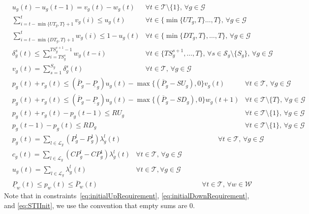 \documentclass{article}
\newcommand{\cT}{{\mathcal T}}
\newcommand{\cS}{{\mathcal S}}
\newcommand{\cG}{{\mathcal G}}
\newcommand{\cL}{{\mathcal L}}
\newcommand{\cW}{{\mathcal W}}
\newcommand{\uP}{\underline{P}}
\newcommand{\oP}{\overline{P}}
\begin{document}
{\begin{align}
		& u_g(t) - u_g(t-1) = v_g(t) - w_g(t) & \forall t \in \cT\setminus\{1\}, \, \forall g \in \cG \label{eq:Logical} \\
		& \sum_{i= t-\min\{UT_g,T\} + 1}^t v_g(i) \leq u_g(t) & \forall t \in \{\min\{UT_g,T\} \ldots, T\}, \, \forall g \in \cG \label{eq:Startup} \\
		& \sum_{i= t-\min\{DT_g,T\} + 1}^t w_g(i) \leq 1 - u_g(t) & \forall t \in \{\min\{DT_g, T\}, \ldots, T\}, \, \forall g \in \cG \label{eq:Shutdown} \\
		& \delta^s_g(t) \leq \sum_{i = TS^s_g}^{TS^{s+1}_g-1} w_g(t-i) & \forall t \in \{TS^{s+1}_g,\ldots,T\},\,\forall s \in \cS_g\!\setminus\!\{S_g\},\,  \forall g \in \cG \label{eq:STISelect} \\
		& v_g(t) = \sum_{s = 1}^{S_g} \delta^s_g(t) & \forall t \in \cT,\, \forall g \in \cG \label{eq:STILink}
		\end{align}
		\begin{align}
		& p_g(t) + r_g(t) \leq (\oP_g - \uP_g) u_g(t) - \max\{(\oP_g - SU_g),0\} v_g(t) & \forall t \in \cT, \, \forall g \in \cG \label{eq:MaxOutput1} \\
		& p_g(t) + r_g(t) \leq (\oP_g - \uP_g) u_g(t) - \max\{(\oP_g - SD_g),0\} w_g(t+1) & \forall t \in \cT\setminus \{T\}, \, \forall g \in \cG \label{eq:MaxOutput2} \\
		& p_g(t) + r_g(t) - p_g(t-1) \leq RU_g & \forall t \in \cT\setminus\{1\}, \, \forall g \in \cG \label{eq:RampUp} \\
		& p_g(t-1) - p_g(t) \leq RD_g & \forall t \in \cT\setminus\{1\}, \, \forall g \in \cG \label{eq:RampDown}
		\end{align}
		\begin{align}
		& p_g(t) = \sum_{l \in \cL_g} (P_g^l - P_g^1) \lambda_g^l(t) &\hspace{5cm} \forall t \in \cT, \, \forall g \in \cG \label{eq:PiecewiseParts} \\
		& c_g(t) = \sum_{l \in \cL_g} (CP_g^l - CP_g^1) \lambda_g^l(t) & \forall t \in \cT, \, \forall g \in \cG \label{eq:PiecewisePartsCost} \\
		& u_g(t) = \sum_{l \in \cL_g} \lambda_g^l(t) & \forall t \in \cT, \forall g \in \cG \label{eq:PiecewiseLimits}
		\end{align}
		\begin{align}
		& \uP_w(t) \leq p_w(t) \leq \oP_w(t) &\hspace{6cm} \forall t \in \cT, \, \forall w \in \cW \label{eq:WindLimit}
		\end{align}
}%
Note that in constraints~\eqref{eq:initialUpRequirement}, \eqref{eq:initialDownRequirement}, and \eqref{eq:STIInit}, we use the convention that empty sums are $0$.
\end{document}
